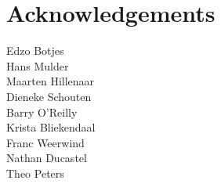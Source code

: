 {}
\chapter*{Acknowledgements}
\lipsum[1]
\bigskip

\noindent Edzo Botjes\\
Hans Mulder\\
Maarten Hillenaar\\
Dieneke Schouten\\
Barry O'Reilly\\
Krista Bliekendaal\\
Franc Weerwind\\
Nathan Ducastel\\
Theo Peters\\
